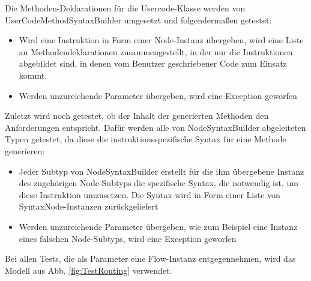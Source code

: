 Die Methoden-Deklarationen für die Usercode-Klasse werden von UserCodeMethodSyntaxBuilder umgesetzt und folgendermaßen getestet:

\begin{itemize}
\item Wird eine Instruktion in Form einer Node-Instanz übergeben, wird eine Liste an Methodendeklarationen zusammengestellt, in der nur die Instruktionen abgebildet sind, in denen vom Benutzer geschriebener Code zum Einsatz kommt.
\item Werden unzureichende Parameter übergeben, wird eine Exception geworfen
\end{itemize}

Zuletzt wird noch getestet, ob der Inhalt der generierten Methoden den Anforderungen entspricht. Dafür werden alle von NodeSyntaxBuilder abgeleiteten Typen getestet, da diese die instruktionsspezifische Syntax  für eine Methode generieren:

\begin{itemize}
\item Jeder Subtyp von NodeSyntaxBuilder erstellt für die ihm übergebene Instanz des zugehörigen Node-Subtyps die spezifische Syntax, die notwendig ist, um diese Instruktion umzusetzen. Die Syntax wird in Form einer Liste von SyntaxNode-Instanzen zurückgeliefert 
\item Werden unzureichende Parameter übergeben, wie zum Beispiel eine Instanz eines falschen Node-Subtyps, wird eine Exception geworfen
\end{itemize}

Bei allen Tests, die als Parameter eine Flow-Instanz entgegennehmen, wird das Modell aus Abb. \ref{fig:TestRouting} verwendet. 

